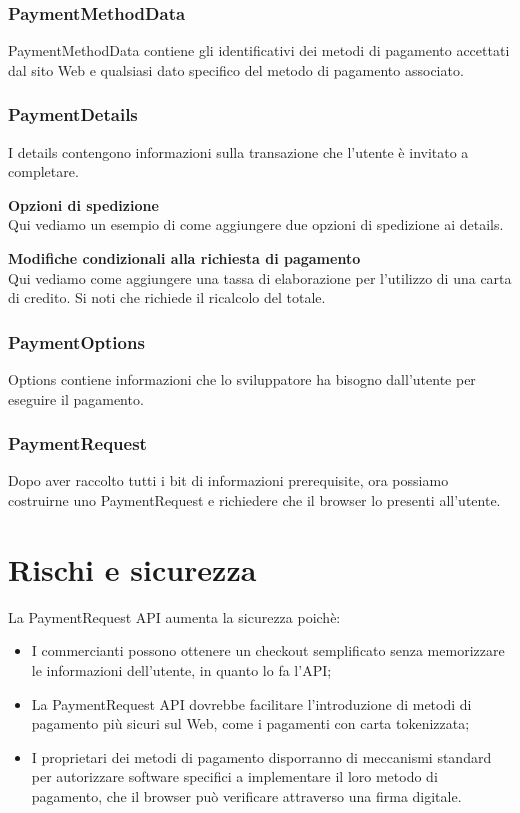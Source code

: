\documentclass[11pt ,a4paper , twoside , openright ]{article}
\begin{document}
	\pagebreak
	\subsubsection{PaymentMethodData}
	PaymentMethodData contiene gli identificativi dei metodi di pagamento accettati dal sito Web e qualsiasi dato specifico del metodo di pagamento associato.
	
	\subsubsection{PaymentDetails}
	I details contengono informazioni sulla transazione che l'utente è invitato a completare.
	
	\pagebreak
	\textbf{Opzioni di spedizione}
	\\
	Qui vediamo un esempio di come aggiungere due opzioni di spedizione ai details.
	
	
	\flushleft\textbf{Modifiche condizionali alla richiesta di pagamento}
	\\
	Qui vediamo come aggiungere una tassa di elaborazione per l'utilizzo di una carta di credito. Si noti che richiede il ricalcolo del totale.
	
	\pagebreak
	\subsubsection{PaymentOptions}
	Options contiene informazioni che lo sviluppatore ha bisogno dall'utente per eseguire il pagamento.
	
	
	
	\subsubsection{PaymentRequest}
	Dopo aver raccolto tutti i bit di informazioni prerequisite, ora possiamo costruirne uno PaymentRequest e richiedere che il browser lo presenti all'utente.
	
	\newpage
	\section{Rischi e sicurezza}
	La PaymentRequest API aumenta la sicurezza poichè:
	\begin{itemize}
		\item I commercianti possono ottenere un checkout semplificato senza memorizzare le informazioni dell'utente, in quanto lo fa l'API;
		\item La PaymentRequest API dovrebbe facilitare l'introduzione di metodi di pagamento più sicuri sul Web, come i pagamenti con carta tokenizzata;
		\item I proprietari dei metodi di pagamento disporranno di meccanismi standard per autorizzare software specifici a implementare il loro metodo di pagamento, che il browser può verificare attraverso una firma digitale.
	\end{itemize}
\end{document}
